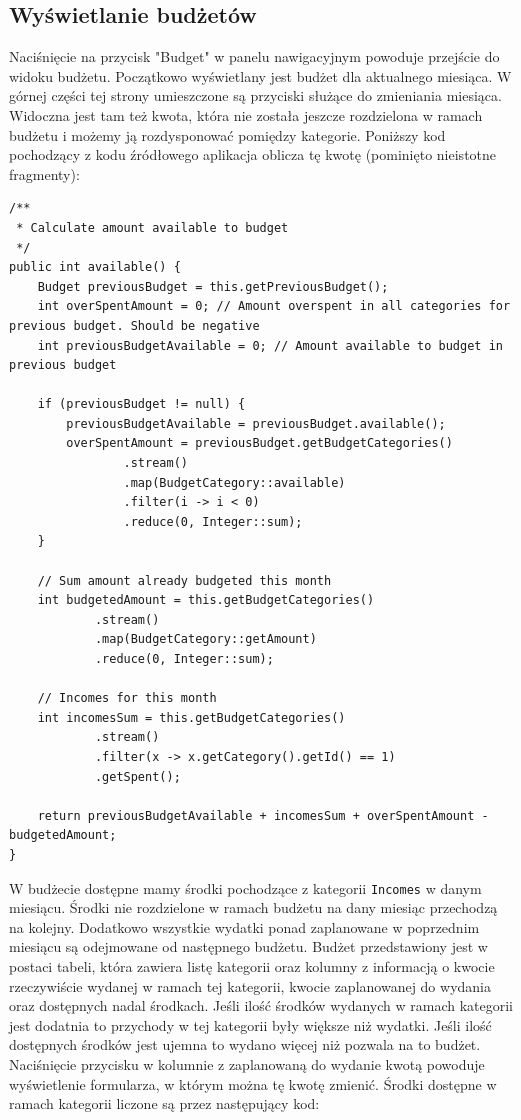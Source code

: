 \documentclass[shortabstract,inz]{iithesis}
\begin{document}
\subsection{Wyświetlanie budżetów}
Naciśnięcie na przycisk "Budget" w panelu nawigacyjnym powoduje przejście do widoku budżetu. Początkowo wyświetlany jest budżet dla aktualnego miesiąca. W górnej części tej strony umieszczone są przyciski służące do zmieniania miesiąca. Widoczna jest tam też kwota, która nie została jeszcze rozdzielona w ramach budżetu i możemy ją rozdysponować pomiędzy kategorie. Poniższy kod pochodzący z kodu źródłowego aplikacja oblicza tę kwotę (pominięto nieistotne fragmenty):
\begin{lstlisting}
/**
 * Calculate amount available to budget
 */
public int available() {
    Budget previousBudget = this.getPreviousBudget();
    int overSpentAmount = 0; // Amount overspent in all categories for previous budget. Should be negative
    int previousBudgetAvailable = 0; // Amount available to budget in previous budget

    if (previousBudget != null) {
    	previousBudgetAvailable = previousBudget.available();
        overSpentAmount = previousBudget.getBudgetCategories()
                .stream()
                .map(BudgetCategory::available)
                .filter(i -> i < 0)
                .reduce(0, Integer::sum);
	}
	
	// Sum amount already budgeted this month
    int budgetedAmount = this.getBudgetCategories()
            .stream()
            .map(BudgetCategory::getAmount)
            .reduce(0, Integer::sum);
            
    // Incomes for this month        
    int incomesSum = this.getBudgetCategories()
            .stream()
            .filter(x -> x.getCategory().getId() == 1)
            .getSpent();

    return previousBudgetAvailable + incomesSum + overSpentAmount - budgetedAmount;
}
\end{lstlisting}
W budżecie dostępne mamy środki pochodzące z kategorii \texttt{Incomes} w danym miesiącu. Środki nie rozdzielone w ramach budżetu na dany miesiąc przechodzą na kolejny. Dodatkowo wszystkie wydatki ponad zaplanowane w poprzednim miesiącu są odejmowane od następnego budżetu. 
Budżet przedstawiony jest w postaci tabeli, która zawiera listę kategorii oraz kolumny z informacją o kwocie rzeczywiście wydanej w ramach tej kategorii, kwocie zaplanowanej do wydania oraz dostępnych nadal środkach. Jeśli ilość środków wydanych w ramach kategorii jest dodatnia to przychody w tej kategorii były większe niż wydatki. Jeśli ilość dostępnych środków jest ujemna to wydano więcej niż pozwala na to budżet. Naciśnięcie przycisku w kolumnie z zaplanowaną do wydanie kwotą powoduje wyświetlenie formularza, w którym można tę kwotę zmienić. Środki dostępne w ramach kategorii liczone są przez następujący kod:
\end{document}
